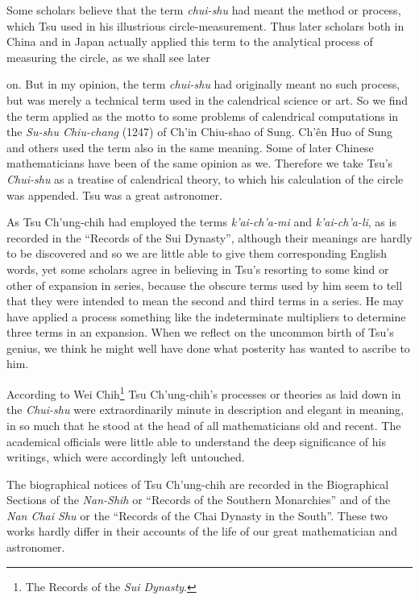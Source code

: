 \documentclass[11pt]{article}
\newcommand{\scanpage}[2]{\clearpage\setcounter{footnote}{0}\noindent{\footnotesize\color{gray}PDF page #1 · #2}\par\medskip}
\newcommand{\scanfooter}{}
\begin{document}
Some scholars believe that the term \emph{chui-shu} had meant the method or process, which Tsu used in his illustrious circle-measurement. Thus later scholars both in China and in Japan actually applied this term to the analytical process of measuring the circle, as we shall see later
\scanfooter

\scanpage{0065}{Chapter 7, printed page 51}
\setcounter{footnote}{0}
on. But in my opinion, the term \emph{chui-shu} had originally meant no such process, but was merely a technical term used in the calendrical science or art. So we find the term applied as the motto to some problems of calendrical computations in the \emph{Su-shu Chiu-chang} (1247) of Ch'in Chiu-shao of Sung. Ch'ên Huo of Sung and others used the term also in the same meaning. Some of later Chinese mathematicians have been of the same opinion as we. Therefore we take Tsu's \emph{Chui-shu} as a treatise of calendrical theory, to which his calculation of the circle was appended. Tsu was a great astronomer.

As Tsu Ch'ung-chih had employed the terms \emph{k'ai-ch'a-mi} and \emph{k'ai-ch'a-li}, as is recorded in the ``Records of the Sui Dynasty'', although their meanings are hardly to be discovered and so we are little able to give them corresponding English words, yet some scholars agree in believing in Tsu's resorting to some kind or other of expansion in series, because the obscure terms used by him seem to tell that they were intended to mean the second and third terms in a series. He may have applied a process something like the indeterminate multipliers to determine three terms in an expansion. When we reflect on the uncommon birth of Tsu's genius, we think he might well have done what posterity has wanted to ascribe to him.

According to Wei Chih\footnote{The Records of the \emph{Sui Dynasty}.} Tsu Ch'ung-chih's processes or theories as laid down in the \emph{Chui-shu} were extraordinarily minute in description and elegant in meaning, in so much that he stood at the head of all mathematicians old and recent. The academical officials were little able to understand the deep significance of his writings, which were accordingly left untouched.

The biographical notices of Tsu Ch'ung-chih are recorded in the Biographical Sections of the \emph{Nan-Shih} or ``Records of the Southern Monarchies'' and of the \emph{Nan Chai Shu} or the ``Records of the Chai Dynasty in the South''. These two works hardly differ in their accounts of the life of our great mathematician and astronomer.
\end{document}
